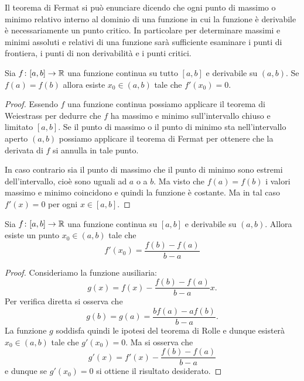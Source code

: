 Il teorema di Fermat si può
enunciare dicendo che ogni punto di massimo o minimo relativo interno
al dominio di una funzione in cui la funzione è derivabile
è necessariamente un punto critico.
In particolare per determinare massimi e minimi assoluti e relativi
di una funzione sarà sufficiente esaminare i punti di frontiera,
i punti di non derivabilità e i punti critici.


\begin{theorem}[Rolle]
\mymark{***}
Sia $f\colon [a,b]\to \mathbb R$ una funzione continua su tutto $[a,b]$ e derivabile su $(a,b)$. Se $f(a) = f(b)$ allora esiste $x_0 \in (a,b)$ tale che $f'(x_0)=0$.
\end{theorem}
%
\begin{proof}
\mymark{***}
Essendo $f$ una funzione continua
possiamo applicare il teorema di Weiestrass per dedurre che $f$ ha massimo e 
minimo sull'intervallo chiuso e limitato $[a,b]$. 
Se il punto di massimo o il punto di minimo sta nell'intervallo aperto 
$(a,b)$ possiamo applicare il teorema di Fermat per ottenere che la derivata 
di $f$ si annulla in tale punto.

In caso contrario sia il punto di massimo che il punto di minimo sono estremi 
dell'intervallo, cioè sono uguali ad $a$ o a $b$. Ma visto che $f(a)=f(b)$ 
i valori massimo e minimo coincidono e quindi la funzione è costante. 
Ma in tal caso $f'(x)=0$ per ogni $x\in [a,b]$.
\end{proof}

\begin{theorem}[Lagrange]\label{th:lagrange}%
\mymark{***}%
%
%
Sia $f\colon [a,b]\to \mathbb R$ una funzione continua su $[a,b]$ e derivabile su $(a,b)$. Allora esiste un punto $x_0\in (a,b)$ tale che
\[
  f'(x_0) = \frac{f(b) - f(a)}{b-a}
\]
\end{theorem}
%
\begin{proof}
\mymark{***}
Consideriamo la funzione ausiliaria:
\[
  g(x) = f(x) - \frac{f(b)-f(a)}{b-a} x.
\]
Per verifica diretta si osserva che
\[
  g(b) = g(a) = \frac{b f(a) - a f(b)}{b-a}.
\]
La funzione $g$ soddisfa quindi le ipotesi del teorema di Rolle e dunque esisterà $x_0\in (a,b)$ tale che $g'(x_0)=0$.
Ma si osserva che
\[
  g'(x) = f'(x) - \frac{f(b)-f(a)}{b-a}
\]
e dunque se $g'(x_0)=0$ si ottiene il risultato desiderato.
\end{proof}


